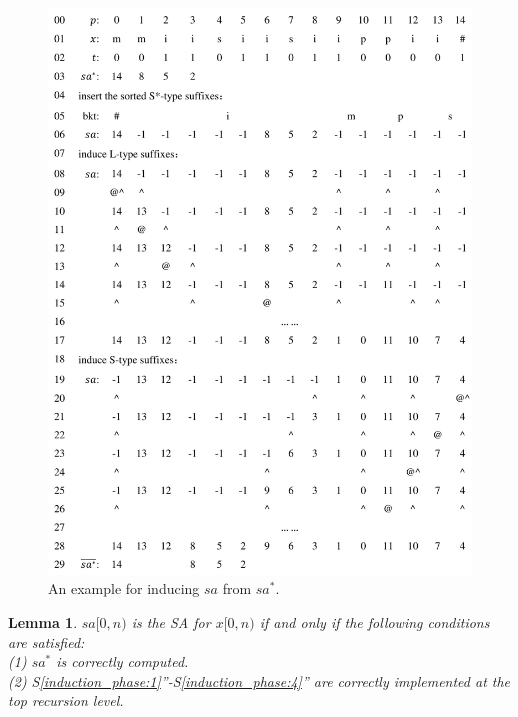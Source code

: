 \documentclass[10pt,journal,compsoc]{IEEEtran}
\newtheorem{lemma}[theorem]{Lemma}
\begin{document}
\begin{figure}[t]
	\centering
	
	\includegraphics[width = 1\columnwidth]{example.pdf}
	
	\caption{An example for inducing $sa$ from $sa^*$.}
	
	\label{fig:example1}
	
\end{figure}


\begin{lemma} \label{lemma:2}
    $sa[0, n)$ is the SA for $x[0, n)$ if and only if the following conditions are satisfied: \\
    (1) $sa^*$ is correctly computed. \\
    (2) S\ref{induction_phase:1}''-S\ref{induction_phase:4}'' are correctly implemented at the top recursion level. \\
\end{lemma}
\end{document}
